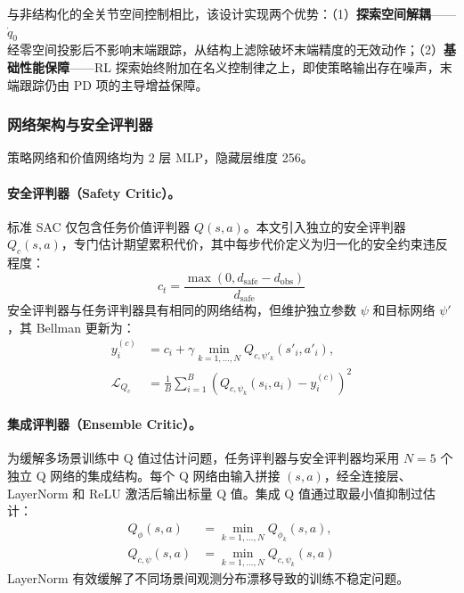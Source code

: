 \documentclass[10pt,conference]{IEEEtran}
\begin{document}
与非结构化的全关节空间控制相比，该设计实现两个优势：（1）\textbf{探索空间解耦}——$\dot{q}_0$ 经零空间投影后不影响末端跟踪，从结构上滤除破坏末端精度的无效动作；（2）\textbf{基础性能保障}——RL 探索始终附加在名义控制律之上，即使策略输出存在噪声，末端跟踪仍由 PD 项的主导增益保障。

\subsubsection{网络架构与安全评判器}
\label{sec:critic_arch}
策略网络和价值网络均为 2 层 MLP，隐藏层维度 256。

\paragraph{安全评判器（Safety Critic）。}标准 SAC 仅包含任务价值评判器 $Q(s,a)$。本文引入独立的安全评判器 $Q_c(s,a)$，专门估计期望累积代价，其中每步代价定义为归一化的安全约束违反程度：
\begin{equation}
c_t = \frac{\max(0, d_{\text{safe}} - d_{\text{obs}})}{d_{\text{safe}}}
\label{eq:cost}
\end{equation}
安全评判器与任务评判器具有相同的网络结构，但维护独立参数 $\psi$ 和目标网络 $\psi'$，其 Bellman 更新为：
\begin{equation}
\begin{aligned}
y_i^{(c)} &= c_i + \gamma \min_{k=1,\dots,N} Q_{c,\psi'_k}(s'_i, a'_i), \\
\mathcal{L}_{Q_c} &= \frac{1}{B}\sum_{i=1}^{B} \left( Q_{c,\psi_k}(s_i,a_i) - y_i^{(c)} \right)^2
\end{aligned}
\label{eq:safety_critic_loss}
\end{equation}

\paragraph{集成评判器（Ensemble Critic）。}为缓解多场景训练中 Q 值过估计问题，任务评判器与安全评判器均采用 $N=5$ 个独立 Q 网络的集成结构。每个 Q 网络由输入拼接 $(s,a)$，经全连接层、LayerNorm 和 ReLU 激活后输出标量 Q 值。集成 Q 值通过取最小值抑制过估计：
\begin{equation}
\begin{aligned}
Q_{\phi}(s,a) &= \min_{k=1,\dots,N} Q_{\phi_k}(s,a), \\
Q_{c,\psi}(s,a) &= \min_{k=1,\dots,N} Q_{c,\psi_k}(s,a)
\end{aligned}
\label{eq:ensemble_q}
\end{equation}
LayerNorm 有效缓解了不同场景间观测分布漂移导致的训练不稳定问题。
\end{document}
